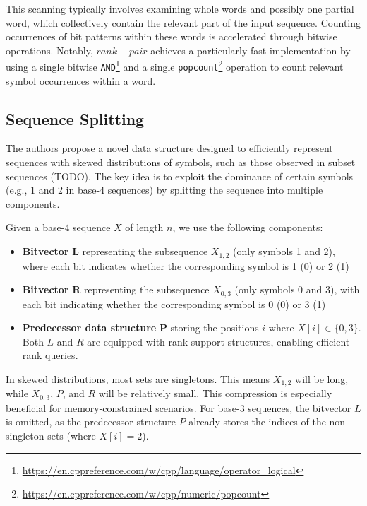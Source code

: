 
\noindent This scanning typically involves examining whole words and possibly one partial word, which collectively contain the relevant part of the input sequence. Counting occurrences of bit patterns within these words is accelerated through bitwise operations. Notably, $rank-pair$ achieves a particularly fast implementation by using a single bitwise \texttt{AND}\footnote{\url{https://en.cppreference.com/w/cpp/language/operator_logical}} and a single \texttt{popcount}\footnote{\url{https://en.cppreference.com/w/cpp/numeric/popcount}} operation to count relevant symbol occurrences within a word.

\subsection{Sequence Splitting}

The authors propose a novel data structure designed to efficiently represent sequences with skewed distributions of symbols, such as those observed in subset sequences (TODO). The key idea is to exploit the dominance of certain symbols (e.g., 1 and 2 in base-4 sequences) by splitting the sequence into multiple components. \vspace{0.4cm}

\noindent Given a base-4 sequence \(X\) of length \(n\), we use the following components:
\begin{itemize}
    \item \textbf{Bitvector} \(\mathbf{L}\) representing the subsequence \(X_{1,2}\) (only symbols 1 and 2), where each bit indicates whether the corresponding symbol is 1 (0) or 2 (1)
    \item \textbf{Bitvector} \(\mathbf{R}\) representing the subsequence \(X_{0,3}\) (only symbols 0 and 3), with each bit indicating whether the corresponding symbol is 0 (0) or 3 (1)
    \item \textbf{Predecessor data structure} \(\mathbf{P}\) storing the positions \(i\) where \(X[i] \in \{0, 3\}\). Both \(L\) and \(R\) are equipped with rank support structures, enabling efficient rank queries.
\end{itemize}

\noindent In skewed distributions, most sets are singletons. This means \(X_{1,2}\) will be long, while \(X_{0,3}\), $P$, and $R$ will be relatively small. This compression is especially beneficial for memory-constrained scenarios. For base-3 sequences, the bitvector \(L\) is omitted, as the predecessor structure \(P\) already stores the indices of the non-singleton sets (where \(X[i] = 2\)).

